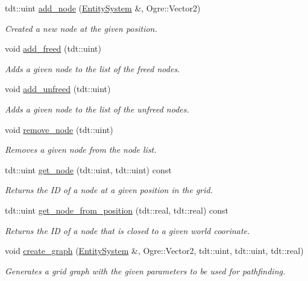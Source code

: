 \begin{DoxyCompactItemize}
tdt\+::uint \hyperlink{class_grid_aa3db753de6e71ff27e027bc660ff68b2}{add\+\_\+node} (\hyperlink{class_entity_system}{Entity\+System} \&, Ogre\+::\+Vector2)
\begin{DoxyCompactList}\small\item\em Created a new node at the given position. \end{DoxyCompactList}\item 
void \hyperlink{class_grid_ad7ba4904bed74c7c98954b213d5abe88}{add\+\_\+freed} (tdt\+::uint)
\begin{DoxyCompactList}\small\item\em Adds a given node to the list of the freed nodes. \end{DoxyCompactList}\item 
void \hyperlink{class_grid_a09a42632297df276042c8188246b30d1}{add\+\_\+unfreed} (tdt\+::uint)
\begin{DoxyCompactList}\small\item\em Adds a given node to the list of the unfreed nodes. \end{DoxyCompactList}\item 
void \hyperlink{class_grid_ab17deada5ff57e05d8db760afcdc35c8}{remove\+\_\+node} (tdt\+::uint)
\begin{DoxyCompactList}\small\item\em Removes a given node from the node list. \end{DoxyCompactList}\item 
tdt\+::uint \hyperlink{class_grid_a916526d229a325f1a5ea3f577b082cc7}{get\+\_\+node} (tdt\+::uint, tdt\+::uint) const 
\begin{DoxyCompactList}\small\item\em Returns the ID of a node at a given position in the grid. \end{DoxyCompactList}\item 
tdt\+::uint \hyperlink{class_grid_ac2491494555c8a002a8c3bcd42ea564f}{get\+\_\+node\+\_\+from\+\_\+position} (tdt\+::real, tdt\+::real) const 
\begin{DoxyCompactList}\small\item\em Returns the ID of a node that is closed to a given world coorinate. \end{DoxyCompactList}\item 
void \hyperlink{class_grid_a23e1873e2854d15170ae8565e46a1729}{create\+\_\+graph} (\hyperlink{class_entity_system}{Entity\+System} \&, Ogre\+::\+Vector2, tdt\+::uint, tdt\+::uint, tdt\+::real)
\begin{DoxyCompactList}\small\item\em Generates a grid graph with the given parameters to be used for pathfinding. \end{DoxyCompactList}\item 

\end{DoxyCompactItemize}
